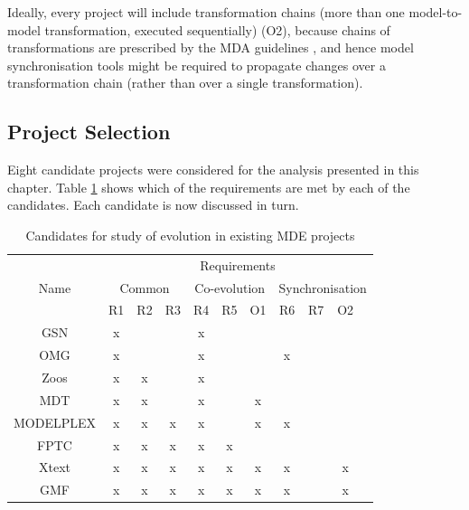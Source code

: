 Ideally, every project will include transformation chains (more than one model-to-model transformation, executed sequentially) (O2), because chains of transformations are prescribed by the MDA guidelines \cite{kleppe03mda}, and hence model synchronisation tools might be required to propagate changes over a transformation chain (rather than over a single transformation).


\subsection{Project Selection}
\label{subsec:project_selection}
Eight candidate projects were considered for the analysis presented in this chapter. Table \ref{tab:candidates} shows which of the requirements are met by each of the candidates. Each candidate is now discussed in turn.

\begin{table}
	\centering
	\begin{tabular}{|c||c|c|c||c|c|c||c|c|c|c|}
		\hline
		\multirow{3}{*}{Name} & \multicolumn{10}{|c|}{Requirements} \\
		\cline{2-11}
		          & \multicolumn{3}{|c||}{Common} & \multicolumn{3}{|c||}{Co-evolution} & \multicolumn{4}{|c|}{Synchronisation} \\
		\cline{2-11}
		          & R1 & R2 & R3 & R4 & R5 & O1 & R6 & R7 & O2 \\
		\hline                                         
		GSN       & x  &    &    & x  &    &    &    &    &    \\
		\hline                                         
		OMG       & x  &    &    & x  &    &    & x  &    &    \\
		\hline                                         
		Zoos      & x  & x  &    & x  &    &    &    &    &    \\
		\hline                                         
		MDT       & x  & x  &    & x  &    & x  &    &    &    \\
		\hline                                         
		MODELPLEX & x  & x  & x  & x  &    & x  & x  &    &    \\
		\hline                                         
		FPTC      & x  & x  & x  & x  & x  &    &    &    &    \\
		\hline                                         
		Xtext     & x  & x  & x  & x  & x  & x  & x  &    & x  \\
		\hline                                         
		GMF       & x  & x  & x  & x  & x  & x  & x  &    & x  \\
		\hline
	\end{tabular}
	\label{tab:candidates}
	\caption{Candidates for study of evolution in existing MDE projects}
\end{table}

